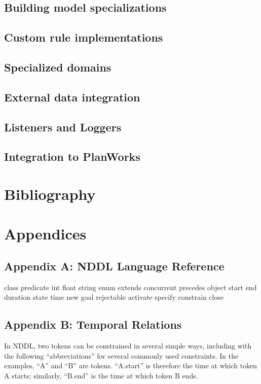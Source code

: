 \documentclass[10pt, letterpaper, twoside]{article}
\begin{document}
{\subsection{Building model specializations}
\subsection{Custom rule implementations}
\subsection{Specialized domains}
\subsection{External data integration}
\subsection{Listeners and Loggers}
\subsection{Integration to PlanWorks}

\section{Bibliography}

\section{Appendices}
\subsection{Appendix A: NDDL Language Reference}

class
predicate
int
float
string
enum
extends
concurrent
precedes
object
start
end
duration
state
time
new
goal
rejectable
activate
specify
constrain
close

\subsection{Appendix B: Temporal Relations}

In NDDL, two tokens can be constrained in several simple ways,
including with the following ``abbreviations'' for several commonly
used constraints.  In the examples, ``A'' and ``B'' are tokens.
``A.start'' is therefore the time at which token A starts; similarly,
``B.end'' is the time at which token B ends.

}
\end{document}
